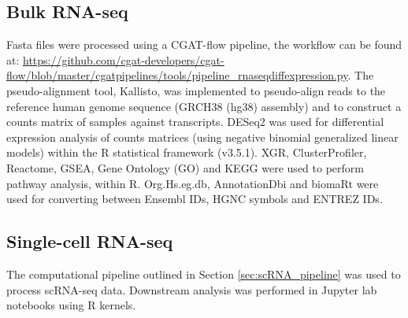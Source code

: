 \subsection{Bulk RNA-seq}\label{subsec:bulk_data_pro}
Fasta files were processed using a CGAT-flow\cite{sims2014cgat} pipeline, the workflow can be found at: \url{https://github.com/cgat-developers/cgat-flow/blob/master/cgatpipelines/tools/pipeline_rnaseqdiffexpression.py}.
The pseudo-alignment tool, Kallisto\cite{bray2016near}, was implemented to pseudo-align reads to the reference human genome sequence (GRCH38 (hg38) assembly) and to construct a counts matrix of samples against transcripts.
DESeq2\cite{love2014moderated} was used for differential expression analysis of  counts  matrices  (using  negative  binomial  generalized  linear  models) within the R statistical framework (v3.5.1).
XGR\cite{fang2016xgr}, ClusterProfiler\cite{yu2012clusterprofiler,wu2021clusterprofiler}, Reactome\cite{fabregat2017reactome}, GSEA\cite{shi2007gene}, Gene Ontology (GO)\cite{gene2019gene} and KEGG\cite{kanehisa2017kegg} were used to perform pathway analysis, within R\@.
Org.Hs.eg.db\cite{carlson2019org}, AnnotationDbi\cite{pages2020annotationdbi} and biomaRt\cite{durinck2009mapping} were used for converting between Ensembl IDs, HGNC symbols and ENTREZ IDs.

\subsection{Single-cell RNA-seq}
The computational pipeline outlined in Section \ref{sec:scRNA_pipeline} was used to process scRNA-seq data.
Downstream analysis was performed in Jupyter lab notebooks\cite{Kluyver2016jupyter} using R kernels.